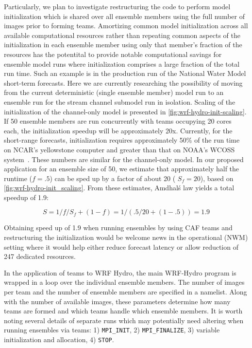 Particularly, we plan to investigate restructuring the code to perform
model initialization which is shared over all ensemble members using
the full number of images prior to forming teams. Amortizing common
model initialization across all available computational resources
rather than repeating common aspects of the initialization in each
ensemble member using only that member's fraction of the resources has
the potentital to provide notable computational savings for
ensemble model runs where initialization comprises a large fraction of
the total run time. Such an example is in the production run of the
National Water Model short-term forecasts. Here we are currently
researching the possibility of moving from the current deterministic
(single ensemble member) model run to an ensemble run for the stream
channel submodel run in isolation. Scaling of the
initialization of the channel-only model is presented in
\ref{fig:wrf-hydro-init-scaling}. If 50 ensemble members are run concurrently with
teams occupying 20 cores each, the initialization speedup will be
approximately 20x. Currently, for the short-range forecasts, 
initialization requires approximately 50\% of the run time on
NCAR's yellowstone computer and greater than that on NOAA's WCOSS
system~\cite{yuetal2017}. These numbers are
similar for the channel-only model. In our proposed application for an ensemble size of 50, we estimate that
approximately half the runtime ($f=.5$) can be sped up by a factor of
about 20 ( $S_f=20$), based on \ref{fig:wrf-hydro-init_scaling}. From
these estimates, Amdhal\'s law yields a total speedup
of 1.9:

\begin{equation}
S = 1 / { f/S_f + (1-f) } = 1 / (.5/20 + (1-.5)) = 1.9
\end{equation}

Obtaining speed up of 1.9 when running ensembles by using CAF
teams and restructuring the initialization would be welcome news in the
operational (NWM) setting where it would help either reduce forecast latency
or allow reduction of 24\/7 dedicated resources.

In the application of teams to WRF Hydro, the main WRF-Hydro program is wrapped in a loop
over the individual ensemble members. The number of images per team and the
 number of ensemble members are specified in a namelist. Along with
 the number of available images, these parameters determine how many
 teams are formed and which teams handle which ensemble members. It is
 worth noting several details of separate runs which may potentially need altering
 when running ensembles via teams: 1) \texttt{MPI\_INIT}, 2) \texttt{MPI\_FINALIZE}, 3)
 variable initialization and allocation, 4) \texttt{STOP}.


